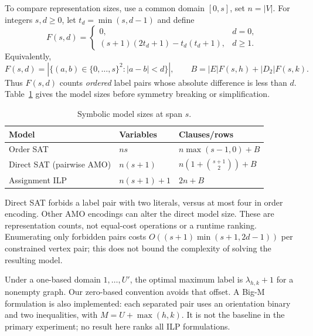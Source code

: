 To compare representation sizes, use a common domain $[0,s]$, set
$n=|V|$. For integers $s,d\geq0$, let $t_d=\min(s,d-1)$ and define
\[
 F(s,d)=
 \begin{cases}
 0, & d=0,\\
 (s+1)(2t_d+1)-t_d(t_d+1), & d\geq1.
 \end{cases}
\]
Equivalently,
\[
 F(s,d)=\left|\{(a,b)\in\{0,\ldots,s\}^2:|a-b|<d\}\right|,
 \qquad
 B=|E|F(s,h)+|D_2|F(s,k).
\]
Thus $F(s,d)$ counts \emph{ordered} label pairs whose absolute
difference is less than $d$.
Table~\ref{tab:submission-symbolic} gives the model sizes before
symmetry breaking or simplification.
\begin{table}[htbp]
\centering\small
\caption{Symbolic model sizes at span $s$.}
\label{tab:submission-symbolic}
\begin{tabular}{lll}
\toprule
Model & Variables & Clauses/rows\\\midrule
Order SAT & $ns$ & $n\max(s-1,0)+B$\\
Direct SAT (pairwise AMO) & $n(s+1)$ & $n(1+\binom{s+1}{2})+B$\\
Assignment ILP & $n(s+1)+1$ & $2n+B$\\
\bottomrule
\end{tabular}
\end{table}
Direct SAT forbids a label pair with two literals, versus at most four
in order encoding. Other AMO encodings can alter the direct model size.
These are representation
counts, not equal-cost operations or a runtime ranking. Enumerating only
forbidden pairs costs $O((s+1)\min(s+1,2d-1))$ per constrained vertex
pair; this does not bound the complexity of solving the resulting model.


Under a one-based domain $1,\ldots,U'$, the optimal maximum label is
$\lambda_{h,k}+1$ for a nonempty graph. Our zero-based convention avoids
that offset. A Big-M formulation is also implemented: each separated
pair uses an orientation binary and two inequalities, with
$M=U+\max(h,k)$. It is not the baseline in the primary experiment;
no result here ranks all ILP formulations.
